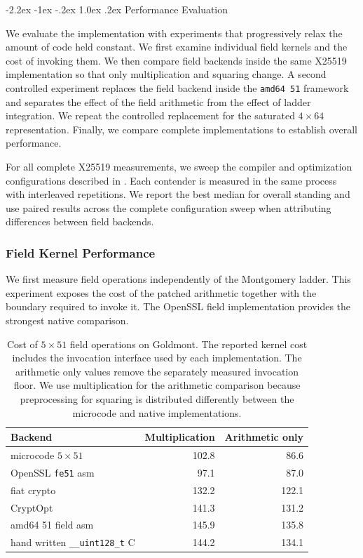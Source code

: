 \documentclass[journal=tches,submission]{iacrtrans}
\makeatletter
\newcommand{\code}[1]{\texttt{#1}}
\renewcommand\subsection{\@startsection{subsection}{2}{\z@}%
      {-2.2ex \@plus -1ex \@minus -.2ex}%
      {1.0ex \@plus .2ex}%
      {\normalfont\large\bfseries\SS@subsectfont}}
\makeatother
\begin{document}
\subsection{Performance Evaluation}
\label{sec}

We evaluate the implementation with experiments that progressively relax the amount of code held constant.
We first examine individual field kernels and the cost of invoking them.
We then compare field backends inside the same X25519 implementation so that only multiplication and squaring change.
A second controlled experiment replaces the field backend inside the \texttt{amd64 51} framework and separates the effect of the field arithmetic from the effect of ladder integration.
We repeat the controlled replacement for the saturated $4\times64$ representation.
Finally, we compare complete implementations to establish overall performance.

For all complete X25519 measurements, we sweep the compiler and optimization configurations described in .
Each contender is measured in the same process with interleaved repetitions.
We report the best median for overall standing and use paired results across the complete configuration sweep when attributing differences between field backends.

\subsubsection{Field Kernel Performance}
\label{sec}

We first measure field operations independently of the Montgomery ladder.
This experiment exposes the cost of the patched arithmetic together with the boundary required to invoke it.
The OpenSSL field implementation provides the strongest native comparison.

\begin{table}[!ht]
\centering
\caption{Cost of $5\times51$ field operations on Goldmont.
The reported kernel cost includes the invocation interface used by each implementation.
The arithmetic only values remove the separately measured invocation floor.
We use multiplication for the arithmetic comparison because preprocessing for squaring is distributed differently between the microcode and native implementations.}
\label{tab}
\footnotesize
\setlength{\tabcolsep}{5pt}
\begin{tabular}{@{}lrr@{}}
\toprule
Backend & Multiplication & Arithmetic only \\
\midrule
microcode $5\times51$ &
102.8 &
86.6 \\
OpenSSL \code{fe51} asm &
97.1 &
87.0 \\
fiat crypto &
132.2 &
122.1 \\
CryptOpt &
141.3 &
131.2 \\
amd64 51 field asm &
145.9 &
135.8 \\
hand written \code{\_\_uint128\_t} C &
144.2 &
134.1 \\
\bottomrule
\end{tabular}
\end{table}
\end{document}
